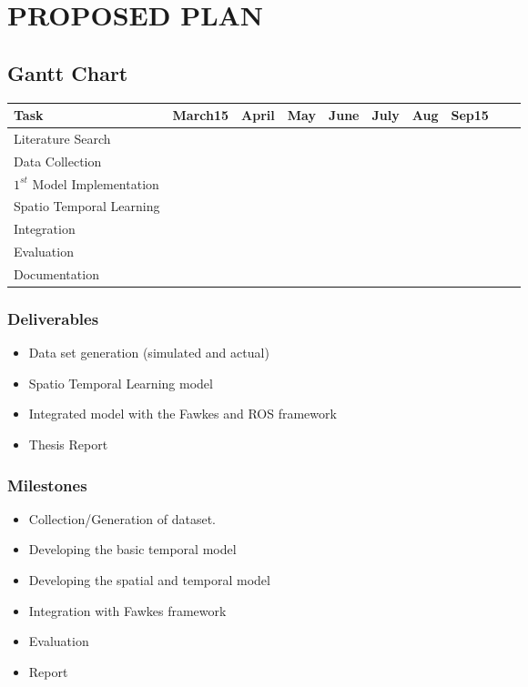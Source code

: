 \chapter{PROPOSED PLAN}

\section{Gantt Chart}
\begin{tabular}{|l|lllllllll|}
\hline
Task & March15 & April & May & June & July & Aug & Sep15\\
\hline
	Literature Search & \cellcolor{green} & \cellcolor{green}& & & & & \\
\hline
	Data Collection & \cellcolor{green} & & & & & &   \\
\hline
	$1^{st}$ Model Implementation &  & \cellcolor{green}& \cellcolor{green}& & & &  \\
\hline
Spatio Temporal Learning &  & & &\cellcolor{green} & \cellcolor{green}& & \\
\hline
    Integration &  & & & & & \cellcolor{green}&  \\
\hline
Evaluation &  & & & & &\cellcolor{green} &\cellcolor{green}  \\
\hline
	Documentation &  &\cellcolor{green}&\cellcolor{green} & \cellcolor{green}& \cellcolor{green}& \cellcolor{green}& \cellcolor{green}\\
\hline

\end{tabular}
\subsection{Deliverables}
\begin{itemize}
	\item Data set generation (simulated and actual)
	\item Spatio Temporal Learning model
    \item Integrated model with the Fawkes and ROS framework
    \item Thesis Report
\end{itemize}

\subsection{Milestones}
\begin{itemize}
	\item Collection/Generation of dataset.
	\item Developing the basic temporal model
	\item Developing the spatial and temporal model
	\item Integration with Fawkes framework
	\item Evaluation
	\item Report
\end{itemize}
